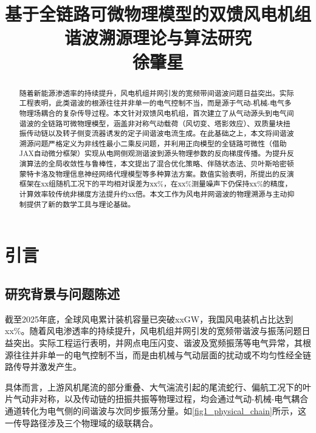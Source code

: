 \documentclass[withoutpreface,bwprint]{cumcmthesis}
\title{\Large 基于全链路可微物理模型的双馈风电机组谐波溯源理论与算法研究 \\ \Large 徐肇星}
\begin{document}
\maketitle

\begin{abstract}
随着新能源渗透率的持续提升，风电机组并网引发的宽频带间谐波问题日益突出。实际工程表明，此类谐波的根源往往并非单一的电气控制不当，而是源于气动-机械-电气多物理场耦合的复杂传导过程。本文针对双馈风电机组，首次建立了从气动源头到电气间谐波的全链路可微物理模型，涵盖非对称气动载荷（风切变、塔影效应）、双质量块扭振传动链以及转子侧变流器诱发的定子间谐波电流生成。在此基础之上，本文将间谐波溯源问题严格定义为非线性最小二乘反问题，并利用正向模型的全链路可微性（借助JAX自动微分框架）实现从电网侧观测谐波到源头物理参数的反向梯度传播。为提升反演算法的全局收敛性与鲁棒性，本文提出了混合优化策略、伴随状态法、贝叶斯哈密顿蒙特卡洛及物理信息神经网络代理模型等多种算法方案。数值实验表明，所提出的反演框架在xx组随机工况下的平均相对误差为xx\%，在xx\%测量噪声下仍保持xx\%的精度，计算效率较传统非梯度方法提升约xx倍。本文工作为风电并网谐波的物理溯源与主动抑制提供了新的数学工具与理论基础。

\end{abstract}

\tableofcontents
\newpage
{}
\setcounter{page}{1}

\section{引言}

\subsection{研究背景与问题陈述}

截至2025年底，全球风电累计装机容量已突破xxGW，我国风电装机占比达到xx\%\cite{globalwind2025}。随着风电渗透率的持续提升，风电机组并网引发的宽频带谐波与振荡问题日益突出。实际工程运行表明，并网点电压闪变、谐波及宽频振荡等电气异常，其根源往往并非单一的电气控制不当，而是由机械与气动层面的扰动或不均匀性经全链路传导并激发产生\cite{wang2025renewable, xiao2018power}。

具体而言，上游风机尾流的部分重叠、大气湍流引起的尾流蛇行、偏航工况下的叶片气动非对称，以及传动链的扭振共振等物理过程，均会通过气动-机械-电气耦合通道转化为电气侧的间谐波与次同步振荡分量\cite{xie2017characteristic, dong2014ssr, li2017complex}。如\cref{fig1_physical_chain}所示，这一传导路径涉及三个物理域的级联耦合。
\end{document}
